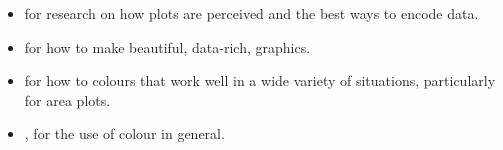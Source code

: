 \begin{itemize}
  \item \citet{cleveland:1993,cleveland:1987,cleveland:1994} for research on how plots are perceived and the best ways to encode data.
  \item \citet{tufte:2006,tufte:1990,tufte:1997,tufte:2001} for how to make beautiful, data-rich, graphics.
  \item \citet{brewer:1994,brewer:1994a} for how to colours that work well in a wide variety of situations, particularly for area plots.
  \item \citet{carr:1999,carr:1994,carr:2002}, for the use of colour in general.
\end{itemize}

